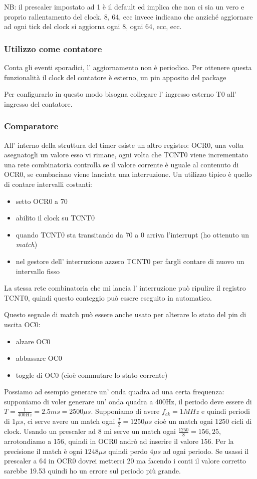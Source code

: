 NB: il prescaler impostato ad 1 è il default ed implica che non ci sia un vero e proprio rallentamento del clock. 8, 64, ecc invece indicano che anziché aggiornare ad ogni tick del clock si aggiorna ogni 8, ogni 64, ecc, ecc.

\subsubsection{Utilizzo come contatore}
Conta gli eventi sporadici, l' aggiornamento non è periodico.
Per ottenere questa funzionalità il clock del contatore è esterno, un pin apposito del package

Per configurarlo in questo modo bisogna collegare l' ingresso esterno T0 all' ingresso del contatore.

\subsubsection{Comparatore}
All' interno della struttura del timer esiste un altro registro: OCR0, una volta asegnatogli un valore esso vi rimane, ogni volta che TCNT0 viene incrementato una rete combinatoria controlla se il valore corrente è uguale al contenuto di OCR0, se combaciano viene lanciata una interruzione.
Un utilizzo tipico è quello di contare intervalli costanti:
\begin{itemize}
    \item setto OCR0 a 70
    \item abilito il clock su TCNT0
    \item quando TCNT0 sta transitando da 70 a 0 arriva l'interrupt (ho ottenuto un \emph{match})
    \item nel gestore dell' interruzione azzero TCNT0 per fargli contare di nuovo un intervallo fisso
\end{itemize}
La stessa rete combinatoria che mi lancia l' interruzione può ripulire il registro TCNT0, quindi questo conteggio può essere eseguito in automatico.

Questo segnale di match può essere anche usato per alterare lo stato del pin di uscita OC0:
\begin{itemize}
    \item alzare OC0
    \item abbassare OC0
    \item toggle di OC0 (cioè commutare lo stato corrente)
\end{itemize}

Possiamo ad esempio generare un' onda quadra ad una certa frequenza: supponiamo di voler generare un' onda quadra a 400Hz, il periodo deve essere di $T = \frac{1}{400 Hz} = 2.5 ms = 2500 \mu s$.
Supponiamo di avere $f_{ck} = 1 MHz$ e quindi periodi di $1\mu s$, ci serve avere un match ogni $\frac{T}{2} = 1250\mu s$ cioè un match ogni 1250 cicli di clock.
Usando un prescaler ad 8 mi serve un match ogni $\frac{1250}{8} = 156,25$, arrotondiamo a 156, quindi in OCR0 andrò ad inserire il valore 156.
Per la precisione il match è ogni $1248\mu s$ quindi perdo $4\mu s$ ad ogni periodo.
Se usassi il prescaler a 64 in OCR0 dovrei metterci 20 ma facendo i conti il valore corretto sarebbe 19.53 quindi ho un errore sul periodo più grande. 

